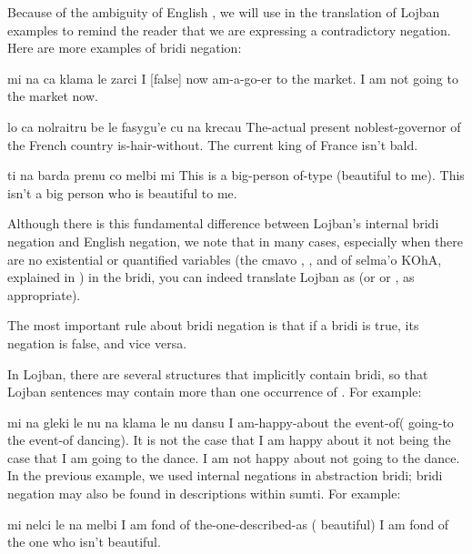 Because of the ambiguity of English , we will use
    \q{[false]} in the translation of Lojban examples to remind the
    reader that we are expressing a contradictory negation. Here
    are more examples of bridi negation:
\begin{example}
mi  na ca klama le zarci\n
I [false] now am-a-go-er to the market.\n
I am not going to the market now.
\end{example}

\begin{example}
lo ca nolraitru\n
\T	be le fasygu'e cu na krecau\n
The-actual present noblest-governor\n
\T	of the French country  is-hair-without.\n
The current king of France isn't bald.
\end{example}

\begin{example}
ti na barda prenu co melbi mi\n
This  is a big-person of-type (beautiful to me).\n
This isn't a big person who is beautiful to me.
\end{example}

Although there is this fundamental difference between
    Lojban's internal bridi negation and English negation, we note
    that in many cases, especially when there are no existential or
    quantified variables (the cmavo , , and  of
    selma'o KOhA, explained in ) in the bridi, you can indeed translate Lojban  as
     (or  or , as appropriate).

The most important rule about bridi negation is that if a
    bridi is true, its negation is false, and vice versa.

In Lojban, there are several structures that implicitly
    contain bridi, so that Lojban sentences may contain more than
    one occurrence of . For example:
\begin{example}
mi na gleki le nu\n
\T	na klama le nu dansu\n
I  am-happy-about the event-of(\n
\T	[false] going-to the event-of dancing).\n
It is not the case that I am happy about it not being\n
\T	the case that I am going to the dance.\n
I am not happy about not going to the dance.
In the previous example, we used internal negations in abstraction
bridi; bridi negation may also be found in descriptions within
sumti.  For example:
\end{example}

\begin{example}
mi nelci le na melbi\n
I am fond of the-one-described-as ( beautiful)\n
I am fond of the one who isn't beautiful.
\end{example}

